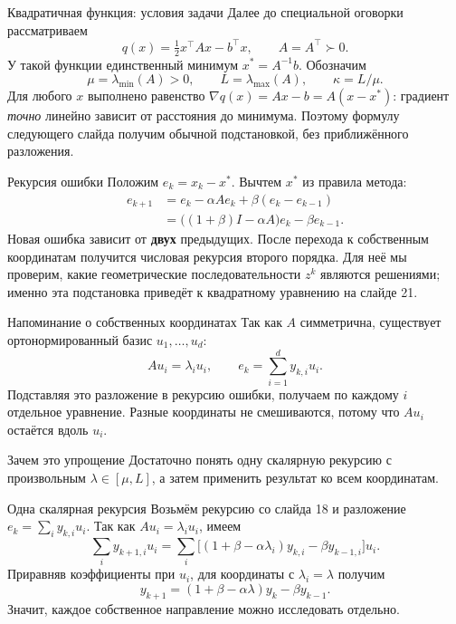 \documentclass[aspectratio=169,10pt]{beamer}
\newcommand{\grad}{\nabla}
\begin{document}
\begin{frame}{Квадратичная функция: условия задачи}
\small
Далее до специальной оговорки рассматриваем
\[
q(x)=\tfrac12x^\top Ax-b^\top x,\qquad A=A^\top\succ0.
\]
У такой функции единственный минимум $x^*=A^{-1}b$. Обозначим
\[
\mu=\lambda_{\min}(A)>0,\qquad L=\lambda_{\max}(A),\qquad
\kappa=L/\mu .
\]
Для любого $x$ выполнено равенство $\grad q(x)=Ax-b=A(x-x^*)$: градиент \emph{точно} линейно зависит от расстояния до минимума. Поэтому формулу следующего слайда получим обычной подстановкой, без приближённого разложения.
\end{frame}

\begin{frame}{Рекурсия ошибки}
\small
Положим $e_k=x_k-x^*$. Вычтем $x^*$ из правила метода:
\begin{align*}
e_{k+1}
 &=e_k-\alpha A e_k+\beta(e_k-e_{k-1})\\
 &=\bigl((1+\beta)I-\alpha A\bigr)e_k-\beta e_{k-1}.
\end{align*}
Новая ошибка зависит от \textbf{двух} предыдущих. После перехода к собственным координатам получится числовая рекурсия второго порядка. Для неё мы проверим, какие геометрические последовательности $z^k$ являются решениями; именно эта подстановка приведёт к квадратному уравнению на слайде 21.
\end{frame}

\begin{frame}{Напоминание о собственных координатах}
\small
Так как $A$ симметрична, существует ортонормированный базис $u_1,\ldots,u_d$:
\[
Au_i=\lambda_i u_i,\qquad e_k=\sum_{i=1}^d y_{k,i}u_i.
\]
Подставляя это разложение в рекурсию ошибки, получаем по каждому $i$ отдельное уравнение. Разные координаты не смешиваются, потому что $Au_i$ остаётся вдоль $u_i$.
\begin{block}{Зачем это упрощение}
Достаточно понять одну скалярную рекурсию с произвольным $\lambda\in[\mu,L]$, а затем применить результат ко всем координатам.
\end{block}
\end{frame}

\begin{frame}{Одна скалярная рекурсия}
\small
Возьмём рекурсию со слайда 18 и разложение $e_k=\sum_i y_{k,i}u_i$.
Так как $Au_i=\lambda_i u_i$, имеем
\[
\sum_i y_{k+1,i}u_i
=\sum_i\bigl[(1+\beta-\alpha\lambda_i)y_{k,i}-\beta y_{k-1,i}\bigr]u_i.
\]
Приравняв коэффициенты при $u_i$, для координаты с $\lambda_i=\lambda$ получим
\[
\boxed{y_{k+1}=(1+\beta-\alpha\lambda)y_k-\beta y_{k-1}.}
\]
Значит, каждое собственное направление можно исследовать отдельно.
\end{frame}
\end{document}
